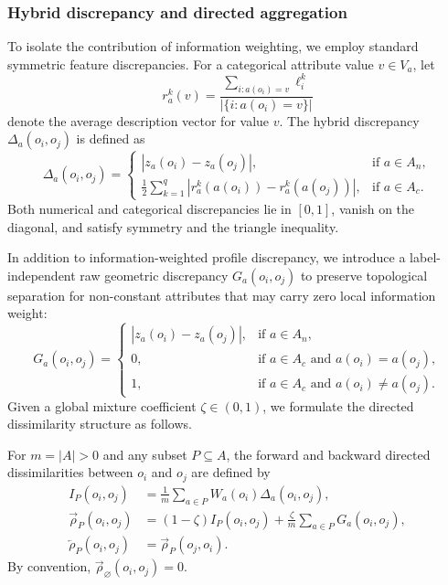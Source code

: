 \subsubsection{Hybrid discrepancy and directed aggregation}
To isolate the contribution of information weighting, we employ standard symmetric feature discrepancies. For a categorical attribute value $v \in V_a$, let
\begin{equation}
	r_a^k(v) = \frac{\sum_{i: a(o_i)=v} \ell_i^k}{|\{i : a(o_i)=v\}|}
	\label{eq:categorical-profile}
\end{equation}
denote the average description vector for value $v$. The hybrid discrepancy $\Delta_a(o_i, o_j)$ is defined as
\begin{equation}
	\Delta_a(o_i,o_j) = \begin{cases}
		|z_a(o_i) - z_a(o_j)|, & \text{if } a \in A_n, \\[4pt]
		\displaystyle\frac{1}{2} \sum_{k=1}^q |r_a^k(a(o_i)) - r_a^k(a(o_j))|, & \text{if } a \in A_c.
	\end{cases}
	\label{eq:hybrid-discrepancy}
\end{equation}
Both numerical and categorical discrepancies lie in $[0, 1]$, vanish on the diagonal, and satisfy symmetry and the triangle inequality.

In addition to information-weighted profile discrepancy, we introduce a label-independent raw geometric discrepancy $G_a(o_i, o_j)$ to preserve topological separation for non-constant attributes that may carry zero local information weight:
\begin{equation}
	G_a(o_i,o_j) = \begin{cases}
		|z_a(o_i) - z_a(o_j)|, & \text{if } a \in A_n, \\[4pt]
		0, & \text{if } a \in A_c \text{ and } a(o_i) = a(o_j), \\
		1, & \text{if } a \in A_c \text{ and } a(o_i) \neq a(o_j).
	\end{cases}
	\label{eq:raw-geometric-discrepancy}
\end{equation}
Given a global mixture coefficient $\zeta \in (0,1)$, we formulate the directed dissimilarity structure as follows.

\begin{definition}
	For $m = |A| > 0$ and any subset $P \subseteq A$, the forward and backward directed dissimilarities between $o_i$ and $o_j$ are defined by
	\begin{align}
		I_P(o_i, o_j) &= \frac{1}{m} \sum_{a \in P} W_a(o_i) \Delta_a(o_i, o_j), \label{eq:info-component} \\
		\overrightarrow{\rho}_P(o_i, o_j) &= (1-\zeta) I_P(o_i, o_j) + \frac{\zeta}{m} \sum_{a \in P} G_a(o_i, o_j), \label{eq:relative-forward-directed} \\
		\overleftarrow{\rho}_P(o_i, o_j) &= \overrightarrow{\rho}_P(o_j, o_i). \label{eq:relative-backward-directed}
	\end{align}
	By convention, $\overrightarrow{\rho}_\varnothing(o_i, o_j) = 0$.
\end{definition}

